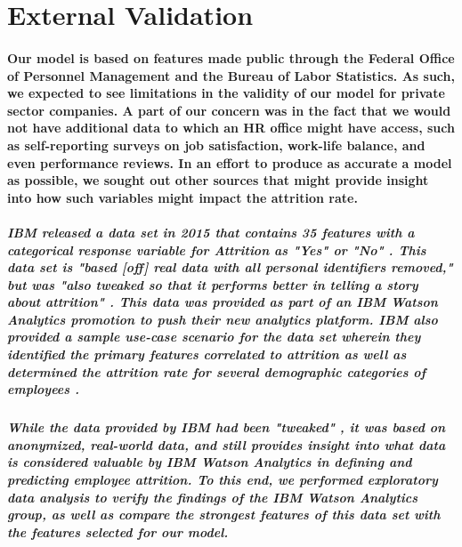 \documentclass[10pt]{article}
\begin{document}
\section{External Validation}

\paragraph{Our model is based on features made public through the Federal Office of Personnel Management and the Bureau of Labor Statistics.  As such, we expected to see limitations in the validity of our model for private sector companies. A part of our concern was in the fact that we would not have additional data to which an HR office might have access, such as self-reporting surveys on job satisfaction, work-life balance, and even performance reviews. In an effort to produce as accurate a model as possible, we sought out other sources that might provide insight into how such variables might impact the attrition rate.}

\subparagraph{IBM released a data set in 2015 that contains 35 features with a categorical response variable for Attrition as "Yes" or "No" \cite{stacker}. This data set is "based [off] real data with all personal identifiers removed," but was "also tweaked so that it performs better in telling a story about attrition" \cite{watson}. This data was provided as part of an IBM Watson Analytics promotion to push their new analytics platform. IBM also provided a sample use-case scenario for the data set wherein they identified the primary features correlated to attrition as well as determined the attrition rate for several demographic categories of employees \cite{alexander}.}

\subparagraph{While the data provided by IBM had been "tweaked" \cite{watson}, it was based on anonymized, real-world data, and still provides insight into what data is considered valuable by IBM Watson Analytics in defining and predicting employee attrition. To this end, we performed exploratory data analysis to verify the findings of the IBM Watson Analytics group, as well as compare the strongest features of this data set with the features selected for our model.}
\end{document}
